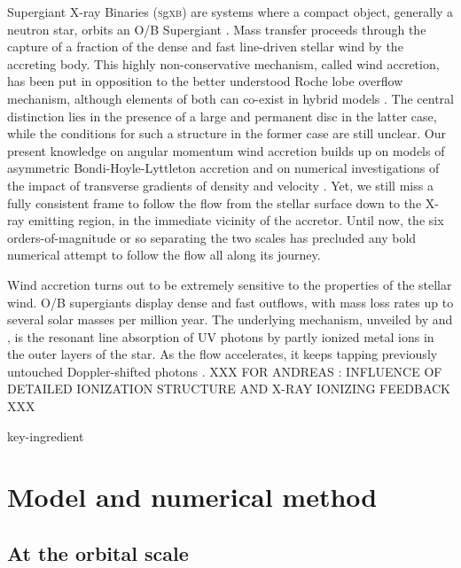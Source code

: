 \documentclass[a4paper,fleqn,usenatbib]{mnras}
\newcommand{\sgx}{\textsc{s}g\textsc{xb}\xspace}
\begin{document}
Supergiant X-ray Binaries (\sgx) are systems where a compact object, generally a neutron star, orbits an O/B Supergiant \citep[see][for a recent review]{Martinez-Nunez2017}. Mass transfer proceeds through the capture of a fraction of the dense and fast line-driven stellar wind by the accreting body. This highly non-conservative mechanism, called wind accretion, has been put in opposition to the better understood Roche lobe overflow mechanism, although elements of both can co-exist in hybrid models \citep{Mohamed,ElMellah2016a}. The central distinction lies in the presence of a large and permanent disc in the latter case, while the conditions for such a structure in the former case are still unclear. Our present knowledge on angular momentum wind accretion builds up on models of asymmetric Bondi-Hoyle-Lyttleton accretion \citep{Illarionov1975,Shapiro1976} and on numerical investigations of the impact of transverse gradients of density \citep{Ruffert1999,MacLeod2015} and velocity \citep{Ruffert1996}. Yet, we still miss a fully consistent frame to follow the flow from the stellar surface down to the X-ray emitting region, in the immediate vicinity of the accretor. Until now, the six orders-of-magnitude or so separating the two scales has precluded any bold numerical attempt to follow the flow all along its journey.

Wind accretion turns out to be extremely sensitive to the properties of the stellar wind. O/B supergiants display dense and fast outflows, with mass loss rates up to several solar masses per million year. The underlying mechanism, unveiled by \cite{Lucy1970} and \cite{Castor1975}, is the resonant line absorption of UV photons by partly ionized metal ions in the outer layers of the star. As the flow accelerates, it keeps tapping previously untouched Doppler-shifted photons \cite{}. XXX FOR ANDREAS : INFLUENCE OF DETAILED IONIZATION STRUCTURE AND X-RAY IONIZING FEEDBACK XXX


 key-ingredient


\section{Model and numerical method}
\label{sec:model}

\subsection{At the orbital scale}
\label{sec:orb_scale}
\end{document}
